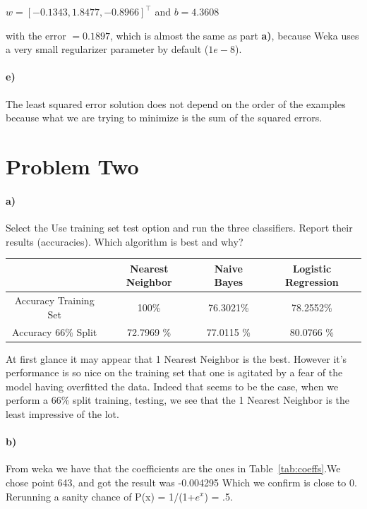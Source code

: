\documentclass{article}
\begin{document}
\begin{center}
$w = [ -0.1343, 1.8477, -0.8966]^\top$ and $b = 4.3608$ 
\end{center}
with the error $= 0.1897$, which is almost the same as part \textbf{a)}, because Weka uses a very small regularizer parameter by default ($1e-8$).

\paragraph{e)} The least squared error solution does not depend on the order of the examples because what we are trying to minimize is the sum of the squared errors.

\section{Problem Two}
\paragraph{a)}
Select the Use training set test option and run the three classifiers. Report their results (accuracies). Which algorithm is best and why?

\begin{table}[ht]
    \begin{center}
    \begin{tabular}{|c|c|c|c|}
   \hline
        & Nearest Neighbor & Naive Bayes & Logistic Regression \\ \hline
         Accuracy Training Set &  100\%&76.3021\% & 78.2552\%   \\ \hline
         Accuracy 66\% Split &  72.7969 \% &77.0115 \% & 80.0766 \% \\\hline
             
     
    \end{tabular}
    \end{center}
\end{table}

At first glance it may appear that 1 Nearest Neighbor is the best. However it's performance is so nice on the training set that one is agitated by a fear of the model having overfitted the data. Indeed that seems to be the case, when we perform a 66\% split training, testing, we see that the 1 Nearest Neighbor is the least impressive of the lot. 

\paragraph{b)}
From weka we have that the coefficients are the ones in Table~\ref{tab:coeffs}.We chose point 643, and got the result was -0.004295 Which we confirm is close to 0. Rerunning a sanity chance of P(x) = 1/(1+$e^x$) = .5. 
\end{document}
